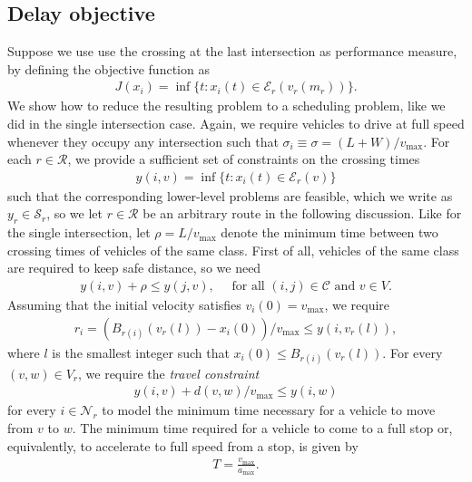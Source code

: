 \documentclass[a4paper]{article}
\theoremstyle{definition}
\theoremstyle{plain}
\begin{document}
\subsection*{Delay objective}

Suppose we use use the crossing at the last intersection as performance measure, by defining the
objective function as
\begin{align}
  J(x_{i}) = \inf \{ t: x_{i}(t) \in \mathcal{E}_{r}(v_{r}(m_{r}))\} .
\end{align}
%
We show how to reduce the resulting problem to a scheduling problem, like we did
in the single intersection case.
%
Again, we require vehicles to drive at full speed whenever they occupy any
intersection such that $\sigma_{i} \equiv \sigma = (L + W) / v_{\max}$.
%
For each $r \in \mathcal{R}$, we provide a sufficient set of constraints on the
crossing times
\begin{align}
y(i, v) = \inf \{ t: x_{i}(t) \in \mathcal{E}_{r}(v) \}
\end{align}
such that the corresponding lower-level problems are feasible, which we write as
$y_{r} \in \mathcal{S}_{r}$, so we let $r \in \mathcal{R}$ be an arbitrary route
in the following discussion.
%
Like for the single intersection,
let $\rho = L / v_{\max}$ denote the minimum time between two crossing times of
vehicles of the same class.
%
First of all, vehicles of the same class are required to keep safe distance, so we need
\begin{align}
  \label{eq:conjunctive_constraints}
  y(i, v) + \rho \leq y(j, v) , \quad \text{ for all } (i,j) \in \mathcal{C} \text{ and } v \in V.
\end{align}
%
Assuming that the initial velocity satisfies
$v_{i}(0) = v_{\max}$, we require
\begin{align}
  \label{eq:release_constraints}
r_{i} = (B_{r(i)}(v_{r}(l)) - x_{i}(0)) / v_{\max} \leq y(i, v_{r}(l)) ,
\end{align}
where $l$ is the smallest integer such that
$x_{i}(0) \leq B_{r(i)}(v_{r}(l))$.
%
For every $(v, w) \in V_{r}$, we require the \textit{travel constraint}
\begin{align}
  \label{eq:travel_constraints}
  y(i, v) + d(v, w) / v_{\max} \leq y(i, w)
\end{align}
for every $i \in \mathcal{N}_{r}$ to model the minimum time necessary for a
vehicle to move from $v$ to $w$.
%
The minimum time required for a vehicle to come to a full stop or, equivalently,
to accelerate to full speed from a stop, is given by
\begin{align*}
  T = \frac{v_{\max}}{a_{\max}} .
\end{align*}
\end{document}
